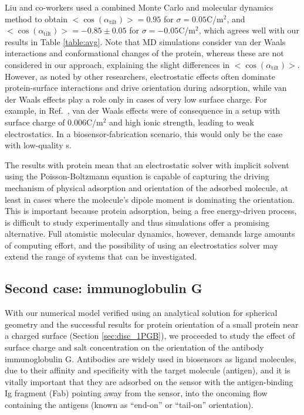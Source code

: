 Liu and co-workers \cite{LiuLiaoZhou2013} used a combined Monte Carlo and molecular dynamics method to obtain $<\cos(\alpha_{\text{tilt}})>=0.95$ for $\sigma = 0.05$C/m$^2$, and $<\cos(\alpha_{\text{tilt}})>=-0.85\pm0.05$ for $\sigma = -0.05$C/m$^2$, which agrees well with our results in Table \ref{table:avg}. Note that MD simulations consider van der Waals interactions and conformational changes of the protein, whereas these are not considered in our approach, explaining the slight differences in $<\cos(\alpha_{\text{tilt}})>$.
However, as noted by other researchers,\cite{ZhouChenJiang2003,BaioWeidnerBaughGambleStaytonCastner2012,LiuLiaoZhou2013} electrostatic effects often dominate protein-surface interactions and drive orientation during adsorption, while van der Waals effects play a role only in cases of very low surface charge. For example, in Ref.~, van der Waals effects were of consequence in a setup with surface charge of 0.006C/m$^{2}$ and high ionic strength, leading to weak electrostatics. In a biosensor-fabrication scenario, this would only be the case with low-quality \sam s.

The results with protein \gb mean that an electrostatic solver with implicit solvent using the Poisson-Boltzmann equation is capable of capturing the driving mechanism of physical adsorption and orientation of the adsorbed molecule, at least in cases where the molecule's dipole moment is dominating the orientation. This is important because protein adsorption, being a free energy-driven process, is difficult to study experimentally\cite{MijajlovicETal2013} and thus simulations offer a promising alternative. Full atomistic molecular dynamics, however, demands large amounts of computing effort, and the possibility of using an electrostatics solver may extend the range of systems that can be investigated.

 \subsection{Second case: immunoglobulin G}
 
 With our numerical model verified using an analytical solution for spherical geometry\cite{CooperBarba2015a} and the successful results for protein orientation of a small protein near a charged surface (Section \ref{sec:disc_1PGB}), we proceeded to study the effect of surface charge and salt concentration on the orientation of the antibody immunoglobulin G. Antibodies are widely used in biosensors as ligand molecules, due to their affinity and specificity with the target molecule (antigen), and it is vitally important that they are adsorbed on the sensor with the antigen-binding Ig fragment (Fab) pointing away from the sensor, into the oncoming flow containing the antigens (known as ``end-on'' or ``tail-on'' orientation).
 
